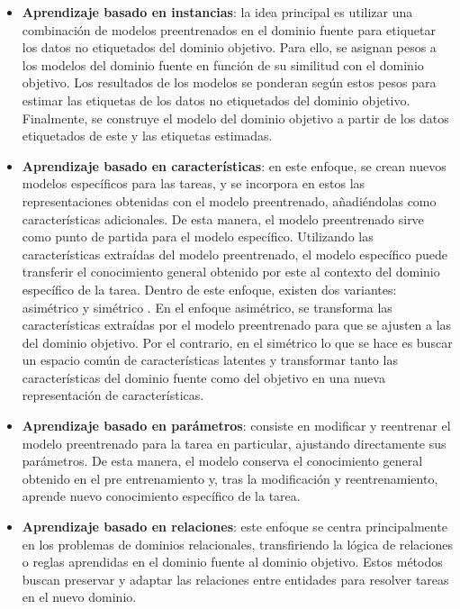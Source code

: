 \documentclass[11pt,spanish,listoffigures,listoftables]{tfgetsinf}
\begin{document}
\begin{itemize}
	\item \textbf{Aprendizaje basado en instancias}: la idea principal es utilizar una combinación de modelos preentrenados en el dominio fuente para etiquetar los datos no etiquetados del dominio objetivo. Para ello, se asignan pesos a los modelos del dominio fuente en función de su similitud con el dominio objetivo. Los resultados de los modelos se ponderan según estos pesos para estimar las etiquetas de los datos no etiquetados del dominio objetivo. Finalmente, se construye el modelo del dominio objetivo a partir de los datos etiquetados de este y las etiquetas estimadas.
	\item \textbf{Aprendizaje basado en características}: en este enfoque, se crean nuevos modelos específicos para las tareas, y se incorpora en estos las representaciones obtenidas con el modelo preentrenado, añadiéndolas como características adicionales. De esta manera, el modelo preentrenado sirve como punto de partida para el modelo específico. Utilizando las características extraídas del modelo preentrenado, el modelo específico puede transferir el conocimiento general obtenido por este al contexto del dominio específico de la tarea. Dentro de este enfoque, existen dos variantes: asimétrico y simétrico  \cite{9134370}. En el enfoque asimétrico, se transforma las características extraídas por el modelo preentrenado para que se ajusten a las del dominio objetivo. Por el contrario, en el simétrico lo que se hace es buscar un espacio común de características latentes y transformar tanto las características del dominio fuente como del objetivo en una nueva representación de características.
	\item \textbf{Aprendizaje basado en parámetros}: consiste en modificar y reentrenar el modelo preentrenado para la tarea en particular, ajustando directamente sus parámetros. De esta manera, el modelo conserva el conocimiento general obtenido en el pre entrenamiento y, tras la modificación y reentrenamiento, aprende nuevo conocimiento específico de la tarea.
	\item \textbf{Aprendizaje basado en relaciones}: este enfoque se centra principalmente en los problemas de dominios relacionales, transfiriendo la lógica de relaciones o reglas aprendidas en el dominio fuente al dominio objetivo. Estos métodos buscan preservar y adaptar las relaciones entre entidades para resolver tareas en el nuevo dominio.
\end{itemize}
\end{document}
